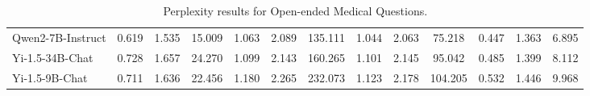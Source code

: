 \begin{table*}[h]
{\begin{tabular}{l|ccc|ccc|ccc|ccc}
Qwen2-7B-Instruct & 0.619 & 1.535 & 15.009 & 1.063 & 2.089 & 135.111 & 1.044 & 2.063 & 75.218 & 0.447 & 1.363 & 6.895 \\
Yi-1.5-34B-Chat & 0.728 & 1.657 & 24.270 & 1.099 & 2.143 & 160.265 & 1.101 & 2.145 & 95.042 & 0.485 & 1.399 & 8.112 \\
Yi-1.5-9B-Chat & 0.711 & 1.636 & 22.456 & 1.180 & 2.265 & 232.073 & 1.123 & 2.178 & 104.205 & 0.532 & 1.446 & 9.968 \\

\bottomrule
\end{tabular}%
}
\caption{Perplexity results for Open-ended Medical Questions.}
\end{table*}